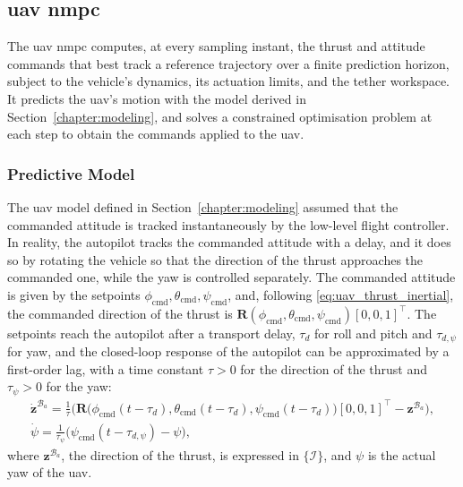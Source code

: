 \subsection{\texorpdfstring{\gls{uav} \gls{nmpc}}{UAV NMPC}}
\label{sec:ctrl_uav_mpc}

The \gls{uav} \gls{nmpc} computes, at every sampling instant, the thrust and attitude commands that best track a reference trajectory over a finite prediction horizon, subject to the vehicle's dynamics, its actuation limits, and the tether workspace. It predicts the \gls{uav}'s motion with the model derived in Section~\ref{chapter:modeling}, and solves a constrained optimisation problem at each step to obtain the commands applied to the \gls{uav}.

\subsubsection*{Predictive Model}

The \gls{uav} model defined in Section~\ref{chapter:modeling} assumed that the commanded attitude is tracked instantaneously by the low-level flight controller. In reality, the autopilot tracks the commanded attitude with a delay, and it does so by rotating the vehicle so that the direction of the thrust approaches the commanded one, while the yaw is controlled separately. The commanded attitude is given by the setpoints $\phi_{\mathrm{cmd}}, \theta_{\mathrm{cmd}}, \psi_{\mathrm{cmd}}$, and, following \eqref{eq:uav_thrust_inertial}, the commanded direction of the thrust is $\mathbf{R}(\phi_{\mathrm{cmd}},\theta_{\mathrm{cmd}},\psi_{\mathrm{cmd}})\allowbreak[0,0,1]^\top$. The setpoints reach the autopilot after a transport delay, $\tau_d$ for roll and pitch and $\tau_{d,\psi}$ for yaw, and the closed-loop response of the autopilot can be approximated by a first-order lag, with a time constant $\tau > 0$ for the direction of the thrust and $\tau_\psi > 0$ for the yaw:
\begin{equation}
    \begin{gathered}
        \dot{\mathbf{z}}^{\mathcal{B}_a} = \frac{1}{\tau}\Big(\mathbf{R}\big(\phi_{\mathrm{cmd}}(t-\tau_d),\theta_{\mathrm{cmd}}(t-\tau_d),\psi_{\mathrm{cmd}}(t-\tau_d)\big)[0,0,1]^\top - \mathbf{z}^{\mathcal{B}_a}\Big), \\
        \dot\psi = \frac{1}{\tau_\psi}\big(\psi_{\mathrm{cmd}}(t-\tau_{d,\psi}) - \psi\big),
    \end{gathered}
    \label{eq:uav_mpc_attitude_lag}
\end{equation}
where $\mathbf{z}^{\mathcal{B}_a}$, the direction of the thrust, is expressed in $\{\mathcal{I}\}$, and $\psi$ is the actual yaw of the \gls{uav}.

